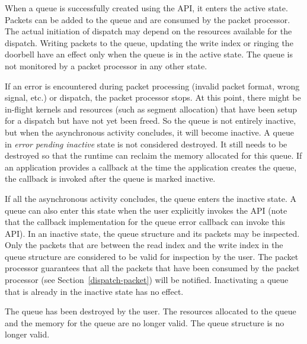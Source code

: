 \documentclass[final]{book}
\begin{document}
\begin{description}[leftmargin=0cm, labelindent=0cm]
\item[Active] When a queue is successfully created using the
   API, it enters the active state. Packets can be
  added to the queue and are consumed by the packet processor. The actual
  initiation of dispatch may depend on the resources available for the
  dispatch. Writing packets to the queue, updating the write index or ringing
  the doorbell have an effect only when the queue is in the active state. The 
  queue is not monitored by a packet processor in any other state.

\item[Error pending inactive] If an error is encountered during packet
  processing (invalid packet format, wrong signal, etc.) or dispatch, the packet
  processor stops. At this point, there might be in-flight kernels and resources
  (such as segment allocation) that have been setup for a dispatch but have not
  yet been freed. So the queue is not entirely inactive, but when the
  asynchronous activity concludes, it will become inactive. A queue in
  \emph{error pending inactive} state is not considered destroyed. It still 
  needs to be destroyed so that the runtime can reclaim the memory allocated
  for this queue. If an application provides a callback at the time the application 
  creates the queue, the callback is invoked after the queue is marked inactive.

\item[Inactive] If all the asynchronous activity concludes, the queue enters the
  inactive state. A queue can also enter this state when the user explicitly
  invokes the  API (note that the callback
  implementation for the queue error callback can invoke this API). In an
  inactive state, the queue structure and its packets may be inspected. Only the
  packets that are between the read index and the write index in the queue
  structure are considered to be valid for inspection by the user. The packet
  processor guarantees that all the packets that have been consumed by the
  packet processor (see Section~\ref{dispatch-packet}) will be notified.
  Inactivating a queue that is already in the inactive state has no effect.

\item[Destroyed] The queue has been destroyed by the user. The resources
  allocated to the queue and the memory for the queue are no longer valid. The
  queue structure is no longer valid.
\end{description}
\end{document}

